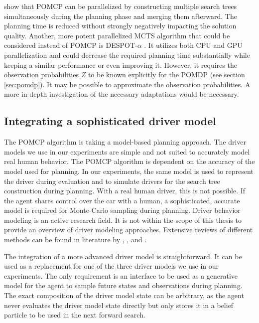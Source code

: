 \cite{pomcp-parallel} show that POMCP can be parallelized by constructing multiple search trees simultaneously during the planning phase and merging them afterward. The planning time is reduced without strongly negatively impacting the solution quality. Another, more potent parallelized MCTS algorithm that could be considered instead of POMCP is DESPOT-$\alpha$ \parencite{despot-a}. It utilizes both CPU and GPU parallelization and could decrease the required planning time substantially while keeping a similar performance or even improving it. However, it requires the observation probabilities $Z$ to be known explicitly for the POMDP (see section \ref{sec:pomdp}). It may be possible to approximate the observation probabilities. A more in-depth investigation of the necessary adaptations would be necessary.

\subsection{Integrating a sophisticated driver model}
\label{sec:complex-driver}

The POMCP algorithm is taking a model-based planning approach. The driver models we use in our experiments are simple and not suited to accurately model real human behavior. The POMCP algorithm is dependent on the accuracy of the model used for planning. In our experiments, the same model is used to represent the driver during evaluation and to simulate drivers for the search tree construction during planning. With a real human driver, this is not possible. If the agent shares control over the car with a human, a sophisticated, accurate model is required for Monte-Carlo sampling during planning. Driver behavior modeling is an active research field. It is not within the scope of this thesis to provide an overview of driver modeling approaches. Extensive reviews of different methods can be found in literature by \cite{model-review-3}, \cite{model-review-4}, and \cite{model-review-5}.

The integration of a more advanced driver model is straightforward. It can be used as a replacement for one of the three driver models we use in our experiments. The only requirement is an interface to be used as a generative model for the agent to sample future states and observations during planning. The exact composition of the driver model state can be arbitrary, as the agent never evaluates the driver model state directly but only stores it in a belief particle to be used in the next forward search.

